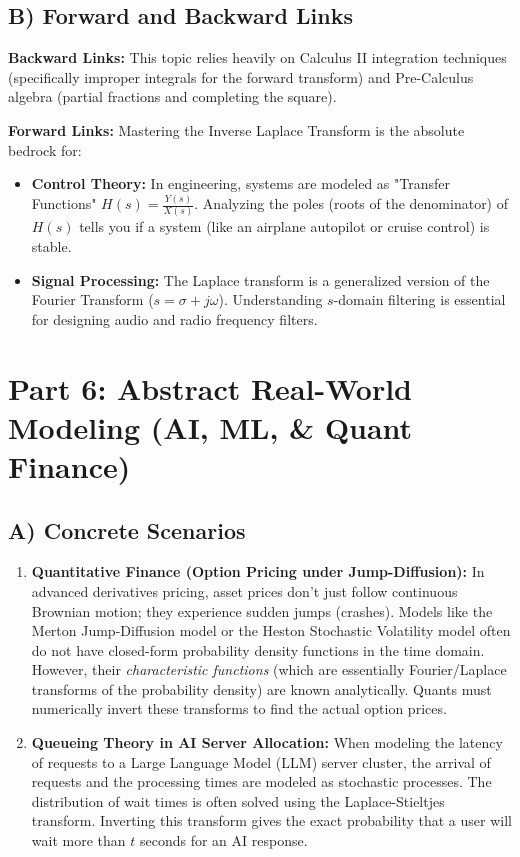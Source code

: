 \documentclass[11pt, a4paper]{article}
\theoremstyle{definition}
\theoremstyle{remark}
\begin{document}
\subsection{B) Forward and Backward Links}
\textbf{Backward Links:} This topic relies heavily on Calculus II integration techniques (specifically improper integrals for the forward transform) and Pre-Calculus algebra (partial fractions and completing the square). 

\textbf{Forward Links:} Mastering the Inverse Laplace Transform is the absolute bedrock for:
\begin{itemize}
    \item \textbf{Control Theory:} In engineering, systems are modeled as "Transfer Functions" $H(s) = \frac{Y(s)}{X(s)}$. Analyzing the poles (roots of the denominator) of $H(s)$ tells you if a system (like an airplane autopilot or cruise control) is stable.
    \item \textbf{Signal Processing:} The Laplace transform is a generalized version of the Fourier Transform ($s = \sigma + j\omega$). Understanding $s$-domain filtering is essential for designing audio and radio frequency filters.
\end{itemize}

\section{Part 6: Abstract Real-World Modeling (AI, ML, \& Quant Finance)}

\subsection{A) Concrete Scenarios}
\begin{enumerate}
    \item \textbf{Quantitative Finance (Option Pricing under Jump-Diffusion):} In advanced derivatives pricing, asset prices don't just follow continuous Brownian motion; they experience sudden jumps (crashes). Models like the Merton Jump-Diffusion model or the Heston Stochastic Volatility model often do not have closed-form probability density functions in the time domain. However, their \textit{characteristic functions} (which are essentially Fourier/Laplace transforms of the probability density) are known analytically. Quants must numerically invert these transforms to find the actual option prices.
    \item \textbf{Queueing Theory in AI Server Allocation:} When modeling the latency of requests to a Large Language Model (LLM) server cluster, the arrival of requests and the processing times are modeled as stochastic processes. The distribution of wait times is often solved using the Laplace-Stieltjes transform. Inverting this transform gives the exact probability that a user will wait more than $t$ seconds for an AI response.
\end{enumerate}
\end{document}
